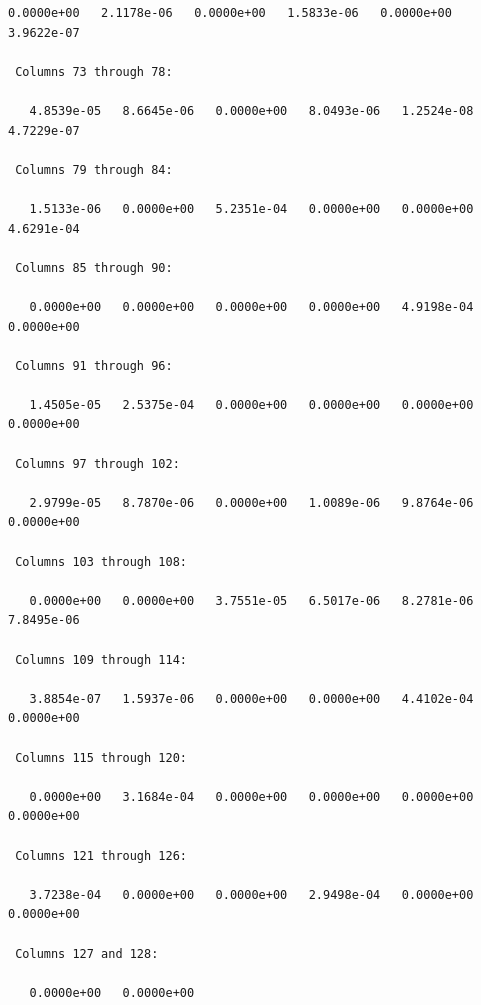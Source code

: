 \begin{lstlisting}[caption={Berechnung des SIFT-Descriptor-Vektors}]
   0.0000e+00   2.1178e-06   0.0000e+00   1.5833e-06   0.0000e+00   3.9622e-07

 Columns 73 through 78:

   4.8539e-05   8.6645e-06   0.0000e+00   8.0493e-06   1.2524e-08   4.7229e-07

 Columns 79 through 84:

   1.5133e-06   0.0000e+00   5.2351e-04   0.0000e+00   0.0000e+00   4.6291e-04

 Columns 85 through 90:

   0.0000e+00   0.0000e+00   0.0000e+00   0.0000e+00   4.9198e-04   0.0000e+00

 Columns 91 through 96:

   1.4505e-05   2.5375e-04   0.0000e+00   0.0000e+00   0.0000e+00   0.0000e+00

 Columns 97 through 102:

   2.9799e-05   8.7870e-06   0.0000e+00   1.0089e-06   9.8764e-06   0.0000e+00

 Columns 103 through 108:

   0.0000e+00   0.0000e+00   3.7551e-05   6.5017e-06   8.2781e-06   7.8495e-06

 Columns 109 through 114:

   3.8854e-07   1.5937e-06   0.0000e+00   0.0000e+00   4.4102e-04   0.0000e+00

 Columns 115 through 120:

   0.0000e+00   3.1684e-04   0.0000e+00   0.0000e+00   0.0000e+00   0.0000e+00

 Columns 121 through 126:

   3.7238e-04   0.0000e+00   0.0000e+00   2.9498e-04   0.0000e+00   0.0000e+00

 Columns 127 and 128:

   0.0000e+00   0.0000e+00
\end{lstlisting}



